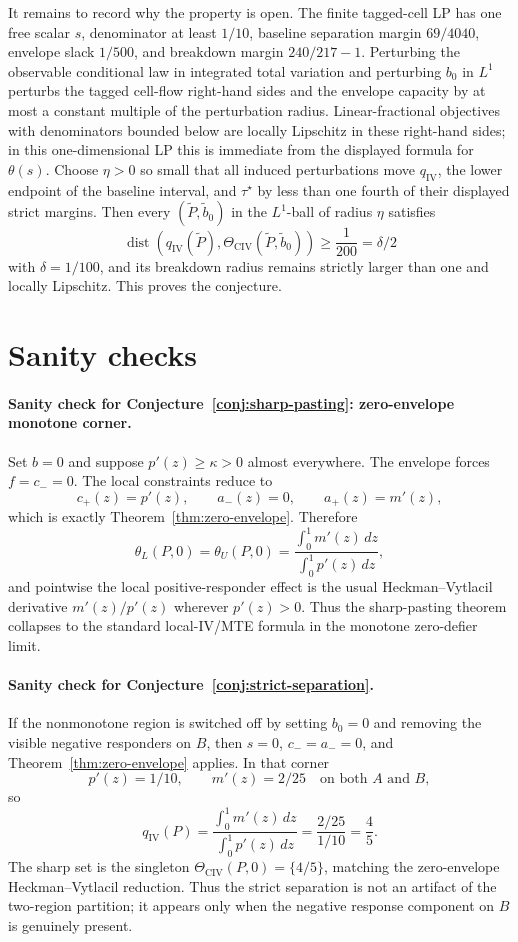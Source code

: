 \documentclass[11pt]{article}
\theoremstyle{definition}
\theoremstyle{plain}
\theoremstyle{remark}
\begin{document}
It remains to record why the property is open.  The finite tagged-cell LP has
one free scalar \(s\), denominator at least \(1/10\), baseline separation
margin \(69/4040\), envelope slack \(1/500\), and breakdown margin
\(240/217-1\).  Perturbing the observable conditional law in integrated total
variation and perturbing \(b_0\) in \(L^1\) perturbs the tagged cell-flow
right-hand sides and the envelope capacity by at most a constant multiple of
the perturbation radius.  Linear-fractional objectives with denominators
bounded below are locally Lipschitz in these right-hand sides; in this
one-dimensional LP this is immediate from the displayed formula for
\(\theta(s)\).  Choose \(\eta>0\) so small that all induced perturbations move
\(q_{\mathrm{IV}}\), the lower endpoint of the baseline interval, and
\(\tau^\star\) by less than one fourth of their displayed strict margins.
Then every \((\widetilde P,\widetilde b_0)\) in the \(L^1\)-ball of radius
\(\eta\) satisfies
\[
\operatorname{dist}\!\left(q_{\mathrm{IV}}(\widetilde P),
\Theta_{\mathrm{CIV}}(\widetilde P,\widetilde b_0)\right)
\ge\frac1{200}
=\delta/2
\]
with \(\delta=1/100\), and its breakdown radius remains strictly larger than
one and locally Lipschitz.  This proves the conjecture.

\section{Sanity checks}
\paragraph{Sanity check for Conjecture~\ref{conj:sharp-pasting}: zero-envelope monotone corner.}
Set \(b=0\) and suppose \(p'(z)\ge\kappa>0\) almost everywhere.  The envelope
forces \(f=c_-=0\).  The local constraints reduce to
\[
c_+(z)=p'(z),\qquad a_-(z)=0,\qquad a_+(z)=m'(z),
\]
which is exactly Theorem~\ref{thm:zero-envelope}.  Therefore
\[
\theta_L(P,0)=\theta_U(P,0)
=
\frac{\int_0^1m'(z)\,dz}{\int_0^1p'(z)\,dz},
\]
and pointwise the local positive-responder effect is the usual
Heckman--Vytlacil derivative \(m'(z)/p'(z)\) wherever \(p'(z)>0\).  Thus the
sharp-pasting theorem collapses to the standard local-IV/MTE formula in the
monotone zero-defier limit.

\paragraph{Sanity check for Conjecture~\ref{conj:strict-separation}.}
If the nonmonotone region is switched off by setting \(b_0=0\) and removing
the visible negative responders on \(B\), then \(s=0\), \(c_-=a_-=0\), and
Theorem~\ref{thm:zero-envelope} applies.  In that corner
\[
p'(z)=1/10,\qquad m'(z)=2/25\quad\text{on both }A\text{ and }B,
\]
so
\[
q_{\mathrm{IV}}(P)=
\frac{\int_0^1m'(z)\,dz}{\int_0^1p'(z)\,dz}
=
\frac{2/25}{1/10}
=\frac45.
\]
The sharp set is the singleton \(\Theta_{\mathrm{CIV}}(P,0)=\{4/5\}\), matching
the zero-envelope Heckman--Vytlacil reduction.  Thus the strict separation is
not an artifact of the two-region partition; it appears only when the negative
response component on \(B\) is genuinely present.
\end{document}
